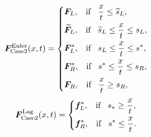 \documentclass{article}
\numberwithin{equation}{section}
\numberwithin{table}{section}
\begin{document}
 \begin{equation}\label{eq:HLLCEP}
   \bm{F}^{\text{Euler}}_{\text{Case2}}(x,t) = \left\{ \begin{aligned}
	   & \bm{F}_L, \hspace{0.3cm} \text{if} \hspace{0.3cm} \frac{x}{t}\le \widetilde{s}_L, \\
		&  \widetilde{\bm{F}}_L, \hspace{0.3cm} \text{if} \hspace{0.3cm} \widetilde{s}_L\le \frac{x}{t} \le   s_L , \\
		&\bm{F}_L^*, \hspace{0.3cm} \text{if} \hspace{0.3cm} s_L\le \frac{x}{t} \le s^*, \\
		& \bm{F}_R^*, \hspace{0.3cm} \text{if} \hspace{0.3cm} s^*\le \frac{x}{t} \le s_R,\\
		& \bm{F}_R, \hspace{0.3cm} \text{if} \hspace{0.3cm} \frac{x}{t}\ge s_R, \\
	  \end{aligned}
	\right.
  \end{equation}
\begin{equation}
	\bm{F}^{\text{Lag}}_{\text{Case2}}(x,t) = \left\{ \begin{aligned}
		& \bm{f}_L^*, \hspace{0.3cm} \text{if} \hspace{0.3cm} s_*\ge \frac{x}{t},\\
		& \bm{f}_R^*, \hspace{0.3cm} \text{if} \hspace{0.3cm} s^*\le \frac{x}{t}.\\
	  \end{aligned}
	\right.
  \end{equation}
\end{document}
